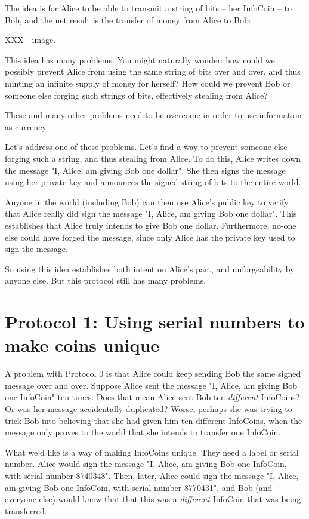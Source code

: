 The idea is for Alice to be able to transmit a string of bits -- her
InfoCoin -- to Bob, and the net result is the transfer of money from
Alice to Bob:

XXX - image.

This idea has many problems.  You might naturally wonder: how could we
possibly prevent Alice from using the same string of bits over and
over, and thus minting an infinite supply of money for herself?  How
could we prevent Bob or someone else forging such strings of bits,
effectively stealing from Alice?

These and many other problems need to be overcome in order to use
information as currency.

Let's address one of these problems.  Let's find a way to prevent
someone else forging such a string, and thus stealing from Alice.  To
do this, Alice writes down the message "I, Alice, am giving Bob one
dollar".  She then signs the message using her private key and
announces the signed string of bits to the entire world.

Anyone in the world (including Bob) can then use Alice's public key to
verify that Alice really did sign the message "I, Alice, am giving Bob
one dollar".  This establishes that Alice truly intends to give Bob
one dollar. Furthermore, no-one else could have forged the message,
since only Alice has the private key used to sign the message. 

So using this idea establishes both intent on Alice's part, and
unforgeability by anyone else.  But this protocol still has many
problems.

\section{Protocol 1: Using serial numbers to make coins unique}

A problem with Protocol 0 is that Alice could keep sending Bob the
same signed message over and over.  Suppose Alice sent the message "I,
Alice, am giving Bob one InfoCoin" ten times.  Does that mean Alice
sent Bob ten \emph{different} InfoCoins?  Or was her message
accidentally duplicated?  Worse, perhaps she was trying to trick Bob
into believing that she had given him ten different InfoCoins, when
the message only proves to the world that she intends to transfer one
InfoCoin.

What we'd like is a way of making InfoCoins unique.  They need a label
or serial number.  Alice would sign the message "I, Alice, am giving
Bob one InfoCoin, with serial number 8740348".  Then, later, Alice
could sign the message "I, Alice, am giving Bob one InfoCoin, with
serial number 8770431", and Bob (and everyone else) would know that
that this was a \emph{different} InfoCoin that was being transferred.

